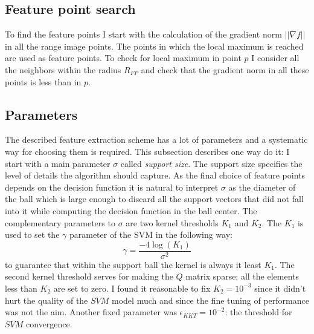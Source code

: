 \subsection{Feature point search}
To find the feature points I start with the calculation of the gradient norm $||\nabla f||$ in all the range image points. The points in which the local maximum is reached are used as feature points. To check for local maximum in point $p$ I consider all the neighbors within the radius $R_{FP}$ and check that the gradient norm in all these points is less than in $p$.

\subsection{Parameters}
The described feature extraction scheme has a lot of parameters and a systematic way for choosing them is required. This subsection describes one way do it: I start with a main parameter $\sigma$ called \textit{support size}. The support size specifies the level of details the algorithm should capture. As the final choice of feature points depends on the decision function it is natural to interpret $\sigma$ as the diameter of the ball which is large enough to discard all the support vectors that did not fall into it while computing the decision function in the ball center. The complementary parameters to $\sigma$ are two kernel thresholds $K_1$ and $K_2$. The $K_1$ is used to set the $\gamma$ parameter of the SVM in the following way:
\begin{equation}
\gamma = \frac{-4 \log (K_1)}{\sigma^2}
\end{equation}
to guarantee that within the support ball the kernel is always it least $K_1$. The second kernel threshold serves for making the $Q$ matrix sparse: all the elements less than $K_2$ are set to zero. I found it reasonable to fix $K_2=10^{-3}$ since it didn't hurt the quality of the $SVM$ model much and since the fine tuning of performance was not the aim. Another fixed parameter was $\epsilon_{KKT}=10^{-2}$: the threshold for $SVM$ convergence.

